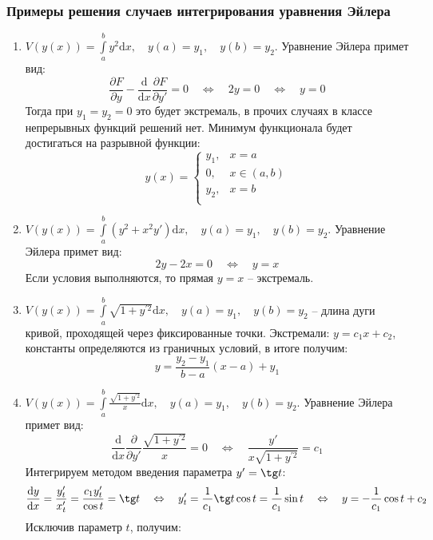 \documentclass[12pt, a4paper]{article}
\newcommand{\di}{\mathrm{d}}
\begin{document}
\begin{small}
\begin{center}
\begin{tabular}{|p{4mm}|p{4cm}|p{50mm}|p{56mm}|}
\end{tabular}
\end{center}
\end{small}

\newpage

\subsubsection{Примеры решения случаев интегрирования уравнения Эйлера}

\begin{enumerate}
 \item $V(y(x)) = \int \limits_a^b y^2 \di x, \quad y(a) = y_1, \quad y(b) = y_2$. Уравнение Эйлера примет вид:
 \[\frac{\partial F}{\partial y} - \frac{\di}{\di x} \frac{\partial F}{\partial y'} = 0 \quad \Leftrightarrow \quad 2y = 0 \quad \Leftrightarrow \quad y = 0 \]
 Тогда при $y_1 = y_2 = 0$ это будет экстремаль, в прочих случаях в классе непрерывных функций решений нет. Минимум функционала будет достигаться на разрывной функции:
 \[y(x) = \begin{cases} y_1, & x=a \\ 0, & x \in (a, b) \\ y_2, & x=b \\ \end{cases} \]
 \item $V(y(x)) = \int \limits_a^b (y^2 + x^2y') \di x, \quad y(a) = y_1, \quad y(b) = y_2$. Уравнение Эйлера примет вид:
 \[2y - 2x = 0 \quad \Leftrightarrow \quad y = x \]
 Если условия выполняются, то прямая $y = x$ -- экстремаль.
 \item $V(y(x)) = \int \limits_a^b \sqrt{1 + y^{\prime 2}} \di x, \quad y(a) = y_1, \quad y(b) = y_2$ -- длина дуги кривой, проходящей через фиксированные точки. Экстремали: $y = c_1x + c_2$, константы определяются из граничных условий, в итоге получим:
 \[y = \frac{y_2-y_1}{b-a} (x-a) + y_1 \]
 \item $V(y(x)) = \int \limits_a^b \frac{\sqrt{1 + y^{\prime 2}}}{x} \di x, \quad y(a) = y_1, \quad y(b) = y_2$. Уравнение Эйлера примет вид:
 \[\frac{\di}{\di x} \frac{\partial}{\partial y'} \frac{\sqrt{1 + y^{\prime 2}}}{x} = 0 \quad \Leftrightarrow \quad \frac{y'}{x \sqrt{1 + y^{\prime 2}}} = c_1 \]
 Интегрируем методом введения параметра $y' = \tg t$:
 \[\frac{\di y}{\di x} = \frac{y_t'}{x_t'} = \frac{c_1y_t'}{\cos t} = \tg t \quad \Leftrightarrow \quad y_t' = \frac{1}{c_1} \tg t \cos t = \frac{1}{c_1} \sin t \quad \Leftrightarrow \quad y = -\frac{1}{c_1} \cos t + c_2 \]
 Исключив параметр $t$, получим:

\end{enumerate}
\end{document}
